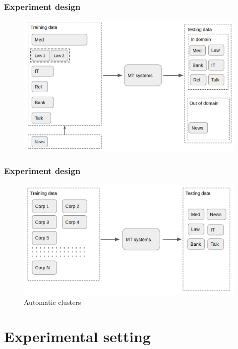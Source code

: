 \documentclass{beamer}
\begin{document}
\begin{frame}
\vspace{-0.2cm}
\frametitle{Experiment design}
\begin{figure}
\includegraphics[width=\textwidth]{mdmt.png}
\end{figure}
\end{frame}
\begin{frame}
\vspace{-0.2cm}
\frametitle{Experiment design}
\begin{figure}
\includegraphics[width=\textwidth]{unlabeled.png}
\caption{Automatic clusters}
\end{figure}
\end{frame}

\section{Experimental setting} %
\end{document}

